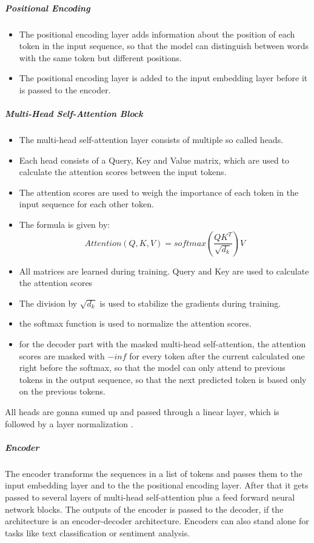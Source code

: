 \subparagraph{Positional Encoding}
\begin{itemize}
    \item The positional encoding layer adds information about the position of each token in the input sequence, so that the model can distinguish between words with the same token but different positions.
    \item The positional encoding layer is added to the input embedding layer before it is passed to the encoder.
\end{itemize}

\subparagraph{Multi-Head Self-Attention Block}
\begin{itemize}
    \item The multi-head self-attention layer consists of multiple so called heads. 
    \item Each head consists of a Query, Key and Value matrix, which are used to calculate the attention scores between the input tokens.
    \item The attention scores are used to weigh the importance of each token in the input sequence for each other token.  
    \item The formula is given by: 
    $$Attention(Q,K, V) = softmax(\frac{QK^T}{\sqrt{d_k}})V$$
    \item All matrices are learned during training. Query and Key are used to calculate the attention scores
    \item The division by $\sqrt{d_k}$ is used to stabilize the gradients during training.
    \item the softmax function is used to normalize the attention scores.
    \item for the decoder part with the masked multi-head self-attention, the attention scores are masked with $-inf$ for every token after the current calculated one right before the softmax, so that the model can only attend to previous tokens in the output sequence, so that the next predicted token is based only on the previous tokens. 
\end{itemize}

All heads are gonna sumed up and passed through a linear layer, which is followed by a layer normalization .


\subparagraph{Encoder}

The encoder transforms the sequences in a list of tokens and passes them to the input embedding layer and to the the positional encoding layer. After that it gets passed to several layers of multi-head self-attention plus a feed forward neural network blocks. The outputs of the encoder is passed to the decoder, if the architecture is an encoder-decoder architecture. Encoders can also stand alone for tasks like text classification or sentiment analysis.

